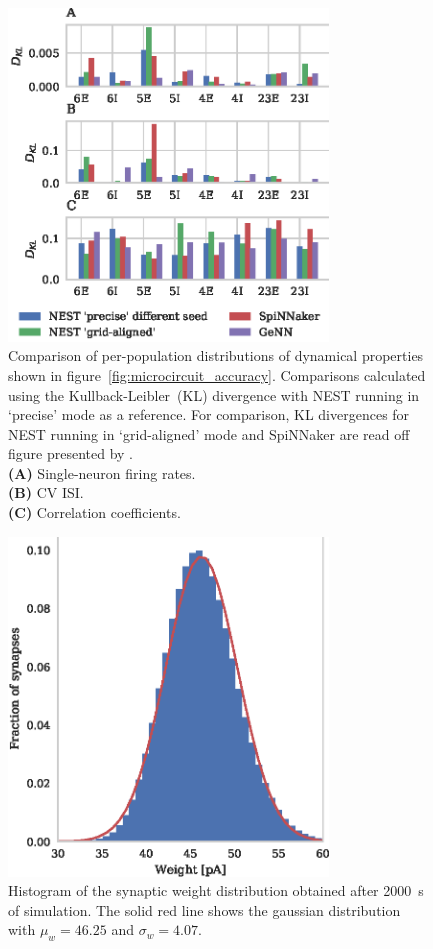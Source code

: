 \documentclass[utf8]{frontiersSCNS} %
\begin{document}
\begin{figure}
    \begin{center}
        \includegraphics[width=85mm]{figures/microcircuit_accuracy_kl}
    \end{center}
    \caption{Comparison of per-population distributions of dynamical properties shown in figure~\ref{fig:microcircuit_accuracy}.
    Comparisons calculated using the Kullback-Leibler~(KL) divergence with NEST running in `precise' mode as a reference.
    For comparison, KL divergences for NEST running in `grid-aligned' mode and SpiNNaker are read off figure presented by \citeauthor{VanAlbada2018}.\\
    \textbf{(A)} Single-neuron firing rates.\\
    \textbf{(B)} CV ISI.\\
    \textbf{(C)} Correlation coefficients.}
    \label{fig:microcircuit_accuracy_kl}
\end{figure}


\begin{figure}
    \begin{center}
        \includegraphics[width=85mm]{figures/mad_weights}
    \end{center}
    \caption{Histogram of the synaptic weight distribution obtained after \SI{2000}{\second} of simulation.
    The solid red line shows the gaussian distribution with $\mu_{w} = 46.25$ and $\sigma_{w} = 4.07$.}
    \label{fig:mad_weights}
\end{figure}
\end{document}
